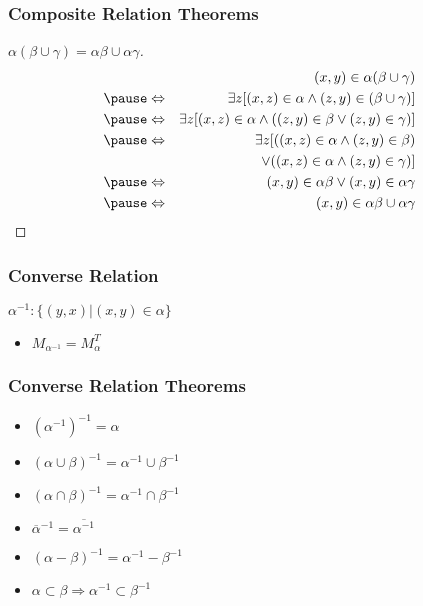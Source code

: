 \documentclass[dvipsnames]{beamer}
\begin{document}
\begin{frame}
  \frametitle{Composite Relation Theorems}

  \begin{proof}[$\alpha (\beta \cup \gamma) = \alpha \beta \cup \alpha \gamma$]
    \begin{eqnarray*}
      &                 & (x,y) \in \alpha (\beta \cup \gamma)\\\pause
      & \Leftrightarrow & \exists z [(x,z) \in \alpha
                              \wedge (z,y) \in (\beta \cup \gamma)]\\\pause
      & \Leftrightarrow & \exists z [(x,z) \in \alpha
                             \wedge ((z,y) \in \beta
                                \vee (z,y) \in \gamma)]\\\pause
      & \Leftrightarrow & \exists z [((x,z) \in \alpha \wedge (z,y) \in \beta)\\
      &                 &     ~~\vee ((x,z) \in \alpha \wedge (z,y) \in \gamma)]\\\pause
      & \Leftrightarrow & (x,y) \in \alpha \beta \vee (x,y) \in \alpha \gamma\\\pause
      & \Leftrightarrow & (x,y) \in \alpha \beta \cup \alpha \gamma
    \end{eqnarray*}
  \end{proof}
\end{frame}

\begin{frame}
  \frametitle{Converse Relation}

  \begin{definition}
    $\alpha^{-1}: \{(y,x) | (x,y) \in \alpha \}$
  \end{definition}

  \pause
  \begin{itemize}
    \item $M_{\alpha^{-1}} = M_{\alpha}^T$
  \end{itemize}
\end{frame}

\begin{frame}
  \frametitle{Converse Relation Theorems}

  \begin{itemize}
    \item $(\alpha^{-1})^{-1} = \alpha$

    \pause
    \item $(\alpha \cup \beta)^{-1} = \alpha^{-1} \cup \beta^{-1}$

    \pause
    \item $(\alpha \cap \beta)^{-1} = \alpha^{-1} \cap \beta^{-1}$

    \pause
    \item $\overline{\alpha}^{-1} = \overline{\alpha^{-1}}$

    \pause
    \item $(\alpha - \beta)^{-1} = \alpha^{-1} - \beta^{-1}$

    \pause
    \item $\alpha \subset \beta \Rightarrow \alpha^{-1} \subset \beta^{-1}$
  \end{itemize}
\end{frame}
\end{document}
